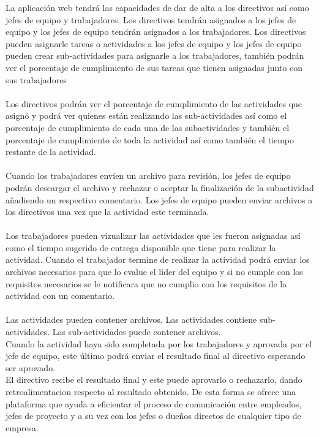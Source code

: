 \documentclass[11pt,a4paper]{article}
\begin{document}
La aplicación web tendrá las capacidades de dar de alta a los directivos así como jefes de equipo y trabajadores. Los directivos tendrán asignados a los jefes de equipo y los jefes de equipo tendrán asignados a los trabajadores. Los directivos pueden asignarle tareas o actividades a los jefes de equipo y los jefes de equipo pueden crear sub-actividades para asignarle a los trabajadores, también podrán ver el porcentaje de cumplimiento de sus tareas que tienen asignadas junto con sus trabajadores
\\
\\
Los directivos podrán ver el porcentaje de cumplimiento de las actividades que asignó y podrá ver quienes están realizando las sub-actividades así como el porcentaje de cumplimiento de cada una de las subactividades y  también el porcentaje de cumplimiento de toda la actividad así como también el tiempo restante de la actividad.
\\
\\
Cuando los trabajadores envíen un archivo para revisión, los jefes de equipo podrán descargar el archivo y rechazar o aceptar la finalización de la subactividad añadiendo un respectivo comentario.
Los jefes de equipo pueden enviar archivos a los directivos una vez que la actividad este terminada.
\\
\\
Los trabajadores pueden vizualizar las actividades que les fueron asignadas así como el tiempo sugerido de entrega disponible que tiene para realizar la actividad. Cuando el trabajador termine de realizar la actividad podrá enviar los archivos necesarios  para que lo evalue el lider del equipo y si no cumple con los requisitos necesarios se le notificara que no cumplio con los requisitos de la actividad con un comentario.
\\
\\
Las actividades pueden contener archivos. 
Las actividades contiene sub-actividades. Las sub-actividades puede contener archivos.
\\
Cuando la actividad haya sido completada por los trabajadores y aprovada por el jefe de equipo, este último podrá enviar el resultado final al directivo esperando ser aprovado.
\\
El directivo recibe el resultado final y este puede aprovarlo o rechazarlo, dando retroalimentacion respecto al resultado obtenido.
De esta forma se ofrece una plataforma que ayuda a eficientar el proceso de comunicación entre empleados, jefes de proyecto y a su vez con los jefes o dueños directos de cualquier tipo de empresa.
\\
\\
\end{document}
